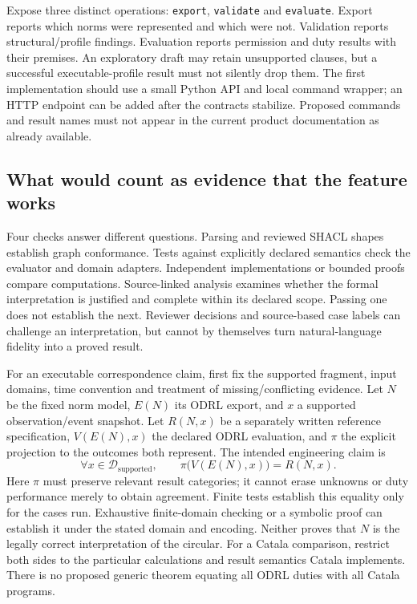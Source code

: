 Expose three distinct operations: \texttt{export}, \texttt{validate} and
\texttt{evaluate}. Export reports which norms were represented and which
were not. Validation reports structural/profile findings. Evaluation reports
permission and duty results with their premises. An exploratory draft may
retain unsupported clauses, but a successful executable-profile result must
not silently drop them. The first implementation should use a small Python
API and local command wrapper; an HTTP endpoint can be added after the
contracts stabilize. Proposed commands and result names must not appear in
the current product documentation as already available.

\subsection{What would count as evidence that the feature works}

Four checks answer different questions. Parsing and reviewed SHACL shapes
establish graph conformance. Tests against explicitly declared semantics check
the evaluator and domain adapters. Independent implementations or bounded
proofs compare computations. Source-linked analysis examines whether the
formal interpretation is justified and complete within its declared scope.
Passing one does not establish the next. Reviewer decisions and source-based
case labels can challenge an interpretation, but cannot by themselves turn
natural-language fidelity into a proved result.

For an executable correspondence claim, first fix the supported fragment,
input domains, time convention and treatment of missing/conflicting evidence.
Let $N$ be the fixed norm model, $E(N)$ its ODRL export, and $x$ a supported
observation/event snapshot. Let $R(N,x)$ be a separately written reference
specification, $V(E(N),x)$ the declared ODRL evaluation, and $\pi$ the
explicit projection to the outcomes both represent. The intended engineering
claim is
\begin{equation}
\label{eq:odrl-correspondence-target}
 \forall x\in\mathcal{D}_{\mathrm{supported}},\qquad
 \pi\bigl(V(E(N),x)\bigr)=R(N,x).
\end{equation}
Here $\pi$ must preserve relevant result categories; it cannot erase unknowns
or duty performance merely to obtain agreement. Finite tests establish this
equality only for the cases run. Exhaustive finite-domain checking or a
symbolic proof can establish it under the stated domain and encoding.
Neither proves that $N$ is the legally correct interpretation of the circular.
For a Catala comparison, restrict both sides to the particular calculations
and result semantics Catala implements. There is no proposed generic theorem
equating all ODRL duties with all Catala programs.

